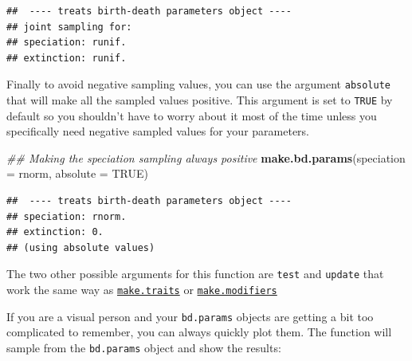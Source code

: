 \documentclass[
]{book}
\newenvironment{Shaded}{\begin{snugshade}}{\end{snugshade}}
\newcommand{\CommentTok}[1]{\textcolor[rgb]{0.56,0.35,0.01}{\textit{#1}}}
\newcommand{\DataTypeTok}[1]{\textcolor[rgb]{0.13,0.29,0.53}{#1}}
\newcommand{\KeywordTok}[1]{\textcolor[rgb]{0.13,0.29,0.53}{\textbf{#1}}}
\newcommand{\NormalTok}[1]{#1}
\newcommand{\OtherTok}[1]{\textcolor[rgb]{0.56,0.35,0.01}{#1}}
\begin{document}
\begin{verbatim}
##  ---- treats birth-death parameters object ---- 
## joint sampling for:
## speciation: runif.
## extinction: runif.
\end{verbatim}

Finally to avoid negative sampling values, you can use the argument \texttt{absolute} that will make all the sampled values positive.
This argument is set to \texttt{TRUE} by default so you shouldn't have to worry about it most of the time unless you specifically need negative sampled values for your parameters.

\begin{Shaded}
\begin{Highlighting}[]
\CommentTok{\#\# Making the speciation sampling always positive}
\KeywordTok{make.bd.params}\NormalTok{(}\DataTypeTok{speciation =}\NormalTok{ rnorm, }\DataTypeTok{absolute =} \OtherTok{TRUE}\NormalTok{)}
\end{Highlighting}
\end{Shaded}

\begin{verbatim}
##  ---- treats birth-death parameters object ---- 
## speciation: rnorm.
## extinction: 0.
## (using absolute values)
\end{verbatim}

The two other possible arguments for this function are \texttt{test} and \texttt{update} that work the same way as \protect\hyperlink{maketraits}{\texttt{make.traits}} or \protect\hyperlink{makemodifiers}{\texttt{make.modifiers}}

If you are a visual person and your \texttt{bd.params} objects are getting a bit too complicated to remember, you can always quickly plot them.
The function will sample from the \texttt{bd.params} object and show the results:
\end{document}

